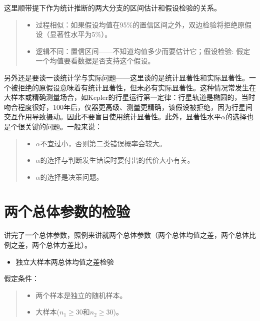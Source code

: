 \documentclass[]{ctexbook}
\providecommand{\tightlist}{%
  \setlength{\itemsep}{0pt}\setlength{\parskip}{0pt}}
\begin{document}
这里顺带提下作为统计推断的两大分支的区间估计和假设检验的关系。

\begin{quote}
\begin{itemize}
\tightlist
\item
  过程相似：如果假设均值在95\%的置信区间之外，双边检验将拒绝原假设（显著性水平为5\%）。
\item
  逻辑不同：置信区间------不知道均值多少而要估计它；假设检验: 假定一个均值要看数据是否支持这个假设。
\end{itemize}
\end{quote}

另外还是要谈一谈统计学与实际问题------这里谈的是统计显著性和实际显著性。一个被拒绝的原假设意味着有统计显著性，但未必有实际显著性。这种情况常发生在大样本或精确测量场合，如Kepler的行星运行第一定律：行星轨道是椭圆的，当时吻合程度很好，100年后，仪器更高级、测量更精确，该假设被拒绝，因为行星间交互作用导致摄动。因此不要盲目使用统计显著性。此外，显著性水平\(\alpha\)的选择也是个很关键的问题。一般来说：

\begin{quote}
\begin{itemize}
\tightlist
\item
  \(\alpha\)不宜过小，否则第二类错误概率会较大。
\item
  \(\alpha\)的选择与判断发生错误时要付出的代价大小有关。
\item
  \(\alpha\)的选择是决策问题。
\end{itemize}
\end{quote}

\hypertarget{ux4e24ux4e2aux603bux4f53ux53c2ux6570ux7684ux68c0ux9a8c}{%
\section{两个总体参数的检验}\label{ux4e24ux4e2aux603bux4f53ux53c2ux6570ux7684ux68c0ux9a8c}}

讲完了一个总体参数，照例来讲就两个总体参数（两个总体均值之差，两个总体比例之差，两个总体方差比）。

\begin{itemize}
\tightlist
\item
  独立大样本两总体均值之差检验
\end{itemize}

假定条件：

\begin{quote}
\begin{itemize}
\tightlist
\item
  两个样本是独立的随机样本。
\item
  大样本(\(n_1\ge30\)和\(n_2\ge30\))。
\end{itemize}
\end{quote}
\end{document}
